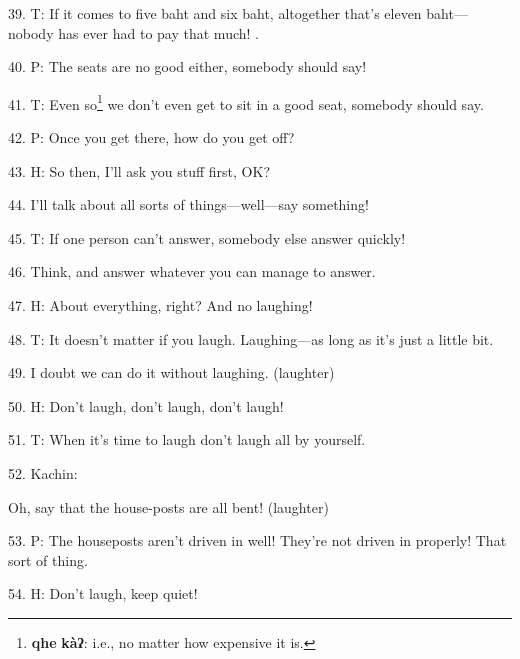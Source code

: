 39. T: If it comes to five baht and six baht, altogether that's eleven baht---nobody
has ever had to pay that much! .

40. P: The seats are no good either, somebody should say!

41. T: Even so\footnote{\textbf{qhe} \textbf{kàʔ}: i.e., no matter how expensive it is.} we don't even get to sit in a good seat, somebody should say.

42. P: Once you get there, how do you get off?

43. H: So then, I'll ask you stuff first, OK?

44. I'll talk about all sorts of things---well---say something!

45. T: If one person can't answer, somebody else answer quickly!

46. Think, and answer whatever you can manage to answer.

47. H: About everything, right? And no laughing!

48. T: It doesn't matter if you laugh. Laughing---as long as it's just a little
bit.

49. I doubt we can do it without laughing. (laughter)

50. H: Don't laugh, don't laugh, don't laugh!

51. T: When it's time to laugh don't laugh all by yourself.

52. Kachin: 

Oh, say that the house-posts are all bent! (laughter)

53. P: The houseposts aren't driven in well! They're not driven in properly!
That sort of thing.

54. H: Don't laugh, keep quiet!

